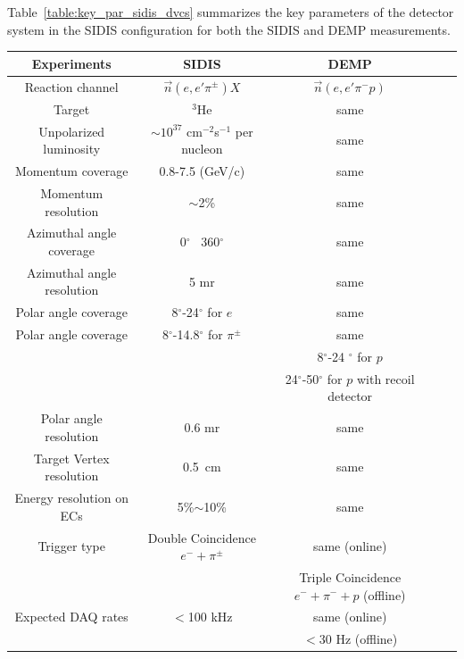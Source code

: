 Table~\ref{table:key_par_sidis_dvcs} summarizes the key parameters of the
detector system in the SIDIS configuration for both the SIDIS and DEMP
measurements.
\begin{table}\centering
\begin{tabular}{|c|c|c|c|c|}
\hline
Experiments                & SIDIS                    & DEMP  \\\hline
Reaction channel           & $\vec{n}(e,e'\pi^{\pm})X$ & $\vec{n}(e,e'\pi^{-}p)$	\\\hline
Target                     & $^3$He                   &same 	\\\hline
Unpolarized luminosity     & $\sim10^{37}$ cm$^{-2}$s$^{-1}$ per nucleon & same	\\\hline 
Momentum coverage          & 0.8-7.5 (GeV/c)          &same 	\\\hline
Momentum resolution        & $\sim$2\%                & same\\\hline
Azimuthal angle coverage   & 0$^{\circ}$ ~360$^{\circ}$ & same	\\\hline
Azimuthal angle resolution & 5 mr                     & same	\\\hline
Polar angle coverage       & 8$^{\circ}$-24$^{\circ}$ for $e$ &  same \\\hline
Polar angle coverage       & 8$^{\circ}$-14.8$^{\circ}$ for $\pi^{\pm}$  &  same 	\\\hline
                           &                          & 8$^{\circ}$-24 $^{\circ}$ for $p$ \\\hline
                           &                          & 24$^{\circ}$-50$^{\circ}$ for $p$ with recoil detector         \\\hline
Polar angle resolution     & 0.6 mr                   & same	\\\hline
Target Vertex resolution   & 0.5~cm                   & same \\\hline
 Energy resolution on ECs  & 5\%$\sim$10\%            & same   \\\hline
Trigger type               & Double Coincidence $e^-+\pi^{\pm}$ & same (online)\\\hline
              &  & Triple Coincidence $e^-+\pi^{-}+p$ (offline)\\\hline

Expected DAQ rates         &  $<$100 kHz              &  same (online)\\\hline
                           &                          &  $<$30 Hz (offline)\\\hline


\end{tabular}
\end{table}

